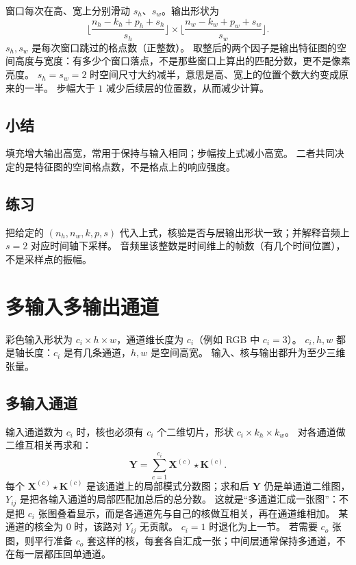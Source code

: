 窗口每次在高、宽上分别滑动 $s_h$、$s_w$。输出形状为
\[
\biggl\lfloor
\frac{n_h-k_h+p_h+s_h}{s_h}
\biggr\rfloor
\times
\biggl\lfloor
\frac{n_w-k_w+p_w+s_w}{s_w}
\biggr\rfloor.
\]
$s_h,s_w$ 是每次窗口跳过的格点数（正整数）。
取整后的两个因子是输出特征图的空间高度与宽度：有多少个窗口落点，不是那些窗口上算出的匹配分数，更不是像素亮度。
$s_h=s_w=2$ 时空间尺寸大约减半，意思是高、宽上的位置个数大约变成原来的一半。
步幅大于 $1$ 减少后续层的位置数，从而减少计算。

\subsection{小结}

填充增大输出高宽，常用于保持与输入相同；步幅按上式减小高宽。
二者共同决定的是特征图的空间格点数，不是格点上的响应强度。

\subsection{练习}

把给定的 $(n_h,n_w,k,p,s)$ 代入上式，核验是否与层输出形状一致；并解释音频上 $s=2$ 对应时间轴下采样。
音频里该整数是时间维上的帧数（有几个时间位置），不是采样点的振幅。

\section{多输入多输出通道}




彩色输入形状为 $c_i\times h\times w$，通道维长度为 $c_i$（例如 RGB 中 $c_i=3$）。
$c_i,h,w$ 都是轴长度：$c_i$ 是有几条通道，$h,w$ 是空间高宽。
输入、核与输出都升为至少三维张量。

\subsection{多输入通道}

输入通道数为 $c_i$ 时，核也必须有 $c_i$ 个二维切片，形状 $c_i\times k_h\times k_w$。
对各通道做二维互相关再求和：
\[
\bm{Y}
=
\sum_{c=1}^{c_i}
\bm{X}^{(c)}\star\bm{K}^{(c)}.
\]
每个 $\bm{X}^{(c)}\star\bm{K}^{(c)}$ 是该通道上的局部模式分数图；求和后 $\bm{Y}$ 仍是单通道二维图，
$Y_{ij}$ 是把各输入通道的局部匹配加总后的总分数。
这就是“多通道汇成一张图”：不是把 $c_i$ 张图叠着显示，而是各通道先与自己的核做互相关，再在通道维相加。
某通道的核全为 $0$ 时，该路对 $Y_{ij}$ 无贡献。
$c_i=1$ 时退化为上一节。
若需要 $c_o$ 张图，则平行准备 $c_o$ 套这样的核，每套各自汇成一张；中间层通常保持多通道，不在每一层都压回单通道。


